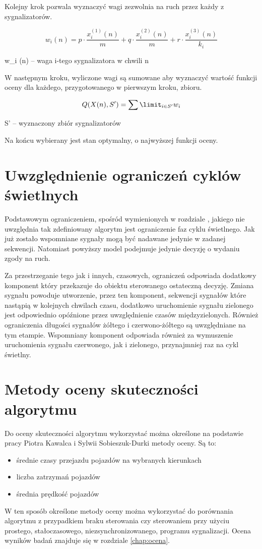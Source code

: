 \vspace{0.5cm}
Kolejny krok pozwala wyznaczyć wagi zezwolnia na ruch przez każdy z sygnalizatorów.

\begin{equation}
	w_{i} (n) = p \cdot \frac{x^{(1)}_{i} (n)}{m} + q \cdot \frac{x^{(2)}_{i} (n)}{m} + r \cdot \frac{x^{(3)}_{i} (n)}{k_{i}}
\end{equation}

w_{i} (n) \textrm{ -- waga i-tego sygnalizatora w chwili n}

\vspace{0.5cm}
W następnym kroku, wyliczone wagi są sumowane aby wyznaczyć wartość funkcji oceny dla każdego, przygotowanego w pierwszym kroku, zbioru.

\begin{equation}
	Q (X(n), S') = \sum\limit_{i \in S'} w_{i}
\end{equation}

S' \textrm{ -- wyznaczony zbiór sygnalizatorów}

\vspace{0.5cm}
Na końcu wybierany jest stan optymalny, o najwyższej funkcji oceny.

\section{Uwzględnienie ograniczeń cyklów świetlnych}
Podstawowym ograniczeniem, spośród wymienionych w rozdziale \label{sec:model_ograniczenia}, jakiego nie uwzględnia tak zdefiniowany algorytm jest ograniczenie faz cyklu świetlnego. Jak już zostało wspomniane  sygnały mogą być nadawane jedynie w zadanej sekwencji. Natomiast powyższy model podejmuje jedynie decyzję o wydaniu zgody na ruch.

Za przestrzeganie tego jak i innych, czasowych, ograniczeń odpowiada dodatkowy komponent który przekazuje do obiektu sterowanego ostateczną decyzję. Zmiana sygnału powoduje utworzenie, przez ten komponent, sekwencji sygnałów które nastąpią w kolejnych chwilach czasu, dodatkowo uruchomienie sygnału zielonego jest odpowiednio opóźnione przez uwzględnienie czasów międzyzielonych. Również ograniczenia długości sygnałów żółtego i czerwono-żółtego są uwzględniane na tym etampie. Wspomniany komponent odpowiada również za wymuszenie uruchomienia sygnału czerwonego, jak i zielonego, przynajmniej raz na cykl świetlny.

\section{Metody oceny skuteczności algorytmu}
Do oceny skuteczności algorytmu wykorzystać można określone na podstawie pracy Piotra Kawalca i Sylwii Sobieszuk-Durki \cite{kawalec+sobieszuk-durka} metody oceny. Są to:
\begin{itemize}
	\item średnie czasy przejazdu pojazdów na wybranych kierunkach
	\item liczba zatrzymań pojazdów
	\item średnia prędkość pojazdów
\end{itemize}

W ten sposób określone metody oceny można wykorzystać do porównania algorytmu z przypadkiem braku sterowania czy sterowaniem przy użyciu prostego, stałoczasowego, niezsynchronizowanego, programu sygnalizacji. Ocena wyników badań znajduje się w rozdziale \ref{chap:ocena}.